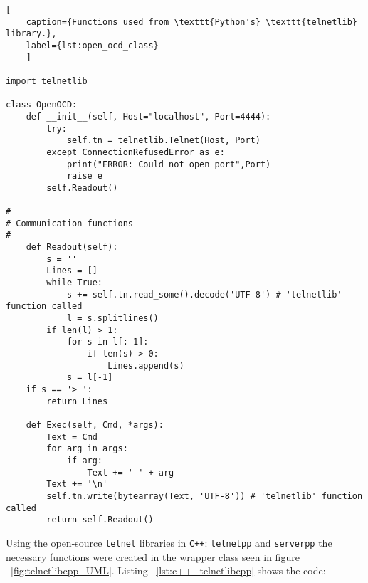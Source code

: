 \begin{lstlisting}[
	caption={Functions used from \texttt{Python's} \texttt{telnetlib} library.},
	label={lst:open_ocd_class}
	]
	
import telnetlib

class OpenOCD:
	def __init__(self, Host="localhost", Port=4444):
		try:
			self.tn = telnetlib.Telnet(Host, Port)
		except ConnectionRefusedError as e:
			print("ERROR: Could not open port",Port)
			raise e
		self.Readout()

#
# Communication functions
#
	def Readout(self):
		s = ''
		Lines = []
		while True:
			s += self.tn.read_some().decode('UTF-8') # 'telnetlib' function called
			l = s.splitlines()
		if len(l) > 1:
			for s in l[:-1]:
				if len(s) > 0:
					Lines.append(s)
			s = l[-1]
	if s == '> ':
		return Lines

	def Exec(self, Cmd, *args):
		Text = Cmd
		for arg in args:
			if arg:
				Text += ' ' + arg
		Text += '\n'
		self.tn.write(bytearray(Text, 'UTF-8')) # 'telnetlib' function called
		return self.Readout()
\end{lstlisting}

Using the open-source \texttt{telnet} libraries in \texttt{C++}: \texttt{telnetpp}\cite{telnetpp_library} and \texttt{serverpp}\cite{serverpp_library} the necessary functions were created in the wrapper class seen in figure ~\ref{fig:telnetlibcpp_UML}. Listing ~\ref{lst:c++_telnetlibcpp} shows the code:


